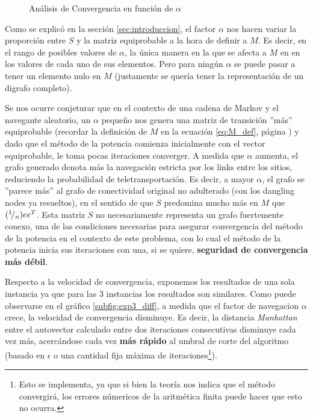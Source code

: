 \begin{figure}[H]
    \centering
    \caption{An\'alisis de Convergencia en funci\'on de $\alpha$}
\end{figure}

\par Como se explic\'o en la secci\'on \ref{sec:introduccion}, el factor
$\alpha$ nos hacen variar la proporci\'on entre $S$ y la matriz equiprobable a
la hora de definir a $M$. Es decir, en el rango de posibles valores de $\alpha$,
la \'unica manera en la que se afecta a $M$ en en los valores de cada uno de sus
elementos. Pero para ning\'un $\alpha$ se puede pasar a tener un elemento nulo
en $M$ (justamente se quer\'ia tener la representaci\'on de un digrafo
completo).

\par Se nos ocurre conjeturar que en el contexto de una cadena de Markov y el
navegante aleatorio, un $\alpha$ pequeño nos genera una matriz de transici\'on
''m\'as'' equiprobable (recordar la definici\'on de $M$ en la ecuaci\'on
\ref{eq:M_def}, p\'agina \pageref{eq:M_def}) y dado que el método de la potencia
comienza inicialmente con el vector equiprobable, le toma pocas iteraciones
converger. A medida que $\alpha$ aumenta, el grafo generado denota más la
navegación estricta por los links entre los sitios, reduciendo la probabilidad
de teletransportación. Es decir, a mayor $\alpha$, el grafo se ''parece m\'as''
al grafo de conectividad original no adulterado (con los dangling nodes ya
resueltos), en el sentido de que $S$ predomina mucho m\'as en $M$ que
$({}^{1}\!/_{n})ee^T$. Esta matriz $S$ no necesariamente representa un grafo
fuertemente conexo, una de las condiciones necesarias para asegurar convergencia
del método de la potencia en el contexto de este problema, con lo cual el método
de la potencia inicia sus iteraciones con una, si se quiere, \textbf{seguridad
de convergencia más débil}.

\par Respecto a la velocidad de convergencia, exponemos los resultados de una
sola instancia ya que para las 3 instancias los resultados son similares. Como
puede observarse en el gráfico \ref{subfig:exp3_diff}, a medida que el factor de
navegacion $\alpha$ crece, la velocidad de convergencia disminuye. Es decir, la
distancia \emph{Manhattan} entre el autovector calculado entre dos iteraciones
consecutivas disminuye cada vez m\'as, acerc\'andose cada vez \textbf{m\'as
rápido} al umbral de corte del algoritmo (basado en $\epsilon$ o una cantidad
fija m\'axima de iteraciones\footnote{Esto se implementa, ya que si bien la
teor\'ia nos indica que el m\'etodo convergir\'a, los errores n\'umericos de la
aritm\'etica finita puede hacer que esto no ocurra.}).
